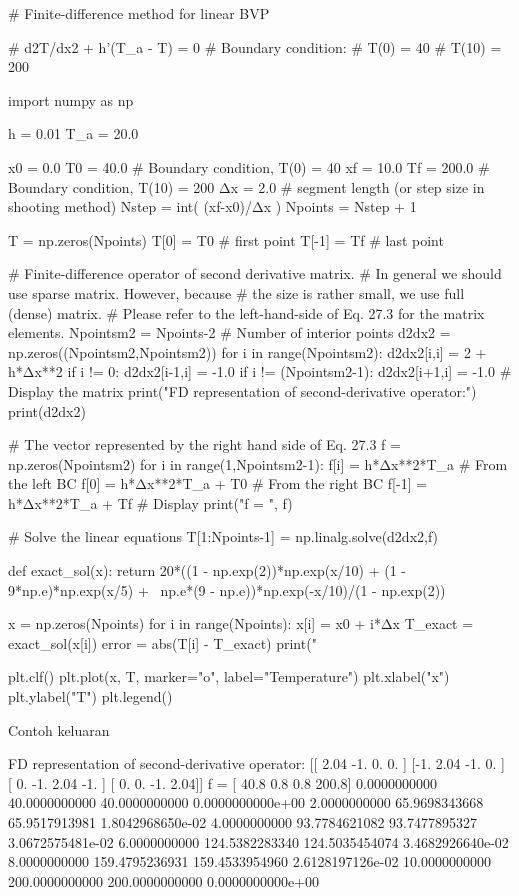 \begin{pythoncode}
# Finite-difference method for linear BVP

# d2T/dx2 + h'(T_a - T) = 0
# Boundary condition:
#   T(0) = 40
#   T(10) = 200

import numpy as np

h = 0.01
T_a = 20.0

x0 = 0.0
T0 = 40.0 # Boundary condition, T(0) = 40
xf = 10.0
Tf = 200.0 # Boundary condition, T(10) = 200
Δx = 2.0 # segment length (or step size in shooting method)
Nstep = int( (xf-x0)/Δx )
Npoints = Nstep + 1

T = np.zeros(Npoints)
T[0] = T0 # first point
T[-1] = Tf # last point 

# Finite-difference operator of second derivative matrix.
# In general we should use sparse matrix. However, because
# the size is rather small, we use full (dense) matrix.
# Please refer to the left-hand-side of Eq. 27.3 for the matrix elements.
Npointsm2 = Npoints-2 # Number of interior points
d2dx2 =  np.zeros((Npointsm2,Npointsm2))
for i in range(Npointsm2):
    d2dx2[i,i] = 2 + h*Δx**2
    if i != 0:
        d2dx2[i-1,i] = -1.0
    if i != (Npointsm2-1):
        d2dx2[i+1,i] = -1.0
# Display the matrix
print("FD representation of second-derivative operator:")
print(d2dx2)

# The vector represented by the right hand side of Eq. 27.3
f = np.zeros(Npointsm2)
for i in range(1,Npointsm2-1):
    f[i] = h*Δx**2*T_a
# From the left BC
f[0] = h*Δx**2*T_a + T0
# From the right BC 
f[-1] = h*Δx**2*T_a + Tf
# Display
print("f = ", f)

# Solve the linear equations
T[1:Npoints-1] = np.linalg.solve(d2dx2,f)

def exact_sol(x):
    return 20*((1 - np.exp(2))*np.exp(x/10) + (1 - 9*np.e)*np.exp(x/5) + \
            np.e*(9 - np.e))*np.exp(-x/10)/(1 - np.exp(2))

x = np.zeros(Npoints)
for i in range(Npoints):
    x[i] = x0 + i*Δx
    T_exact = exact_sol(x[i])
    error = abs(T[i] - T_exact)
    print("%

plt.clf()
plt.plot(x, T, marker="o", label="Temperature")
plt.xlabel("x")
plt.ylabel("T")
plt.legend()
\end{pythoncode}

Contoh keluaran
\begin{textcode}
FD representation of second-derivative operator:
[[ 2.04 -1.    0.    0.  ]
 [-1.    2.04 -1.    0.  ]
 [ 0.   -1.    2.04 -1.  ]
 [ 0.    0.   -1.    2.04]]
f =  [ 40.8   0.8   0.8 200.8]
      0.0000000000      40.0000000000      40.0000000000   0.0000000000e+00
      2.0000000000      65.9698343668      65.9517913981   1.8042968650e-02
      4.0000000000      93.7784621082      93.7477895327   3.0672575481e-02
      6.0000000000     124.5382283340     124.5035454074   3.4682926640e-02
      8.0000000000     159.4795236931     159.4533954960   2.6128197126e-02
     10.0000000000     200.0000000000     200.0000000000   0.0000000000e+00
\end{textcode}


